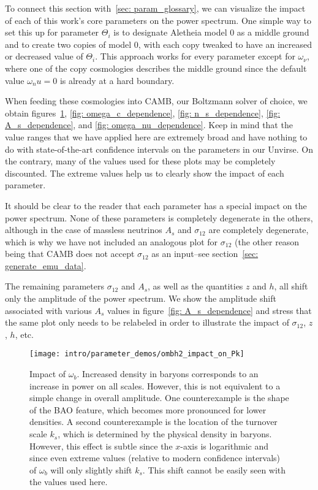 
To connect this section with~\ref{sec: param_glossary}, we can visualize the
impact of each of this work's core parameters on the power spectrum. One
simple way to set this up for parameter $\Theta_i$ is to designate Aletheia 
model 0 as a middle ground and to create two copies of model 0, with each
copy tweaked to have an increased or decreased value of $\Theta_i$. This
approach works for every parameter except for $\omega_\nu$, where one of the
copy cosmologies describes the middle ground since the default value
$\omega_nu = 0$ is already at a hard boundary.

When feeding these cosmologies into CAMB, our Boltzmann solver of choice, we
obtain figures~\ref{fig: omega_b_dependence}, \ref{fig: omega_c_dependence}, 
\ref{fig: n_s_dependence}, \ref{fig: A_s_dependence}, and \ref{fig: 
omega_nu_dependence}. Keep in mind that the value ranges that we have applied
here are extremely broad and have nothing to do with state-of-the-art
confidence intervals on the parameters in our Unvirse. On the 
contrary, many of the values used for these plots may be completely 
discounted. The extreme values help us to clearly show the impact of each
parameter.

It should be
clear to the reader that each parameter has a special impact on the power
spectrum. None of these parameters is completely degenerate in the others,
although in the case of massless neutrinos $A_s$ and $\sigma_{12}$ are
completely degenerate, which is why we have not included an analogous plot for
$\sigma_{12}$ (the other reason being that CAMB does not accept $\sigma_{12}$
as an input--see section~\ref{sec: generate_emu_data}.

The remaining parameters $\sigma_{12}$ and $A_s$, as well as the quantities 
$z$ and $h$, all shift only the amplitude of the power spectrum. We show the 
amplitude shift associated with various $A_s$ values in figure~\ref{fig: 
A_s_dependence} and stress that the same plot only needs to be relabeled in 
order to illustrate the impact of $\sigma_{12}$, $z$, $h$, etc. 

\begin{figure}[htb]
  \centering
  \texttt{[image: intro/parameter\_demos/ombh2\_impact\_on\_Pk]}
  \caption[Impact of $\omega_b$ on $P(k)$]{Impact of $\omega_b$. Increased
  	density in baryons corresponds to an increase in power on all scales.
  	However, this is not equivalent to a simple change in overall amplitude.
  	One counterexample is the shape of the BAO feature, which becomes more
  	pronounced for lower densities. A second counterexample is the location
  	of the turnover scale $k_s$, which is determined by the physical density
  	in baryons. However, this effect is subtle since the $x$-axis is
  	logarithmic and since even extreme values (relative to modern confidence
  	intervals) of $\omega_b$ will only slightly shift $k_s$. This shift
  	cannot be easily seen with the values used here.} 
  \label{fig: omega_b_dependence}
\end{figure}

